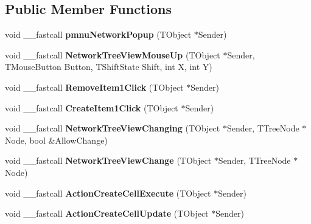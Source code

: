 \subsection*{Public Member Functions}
\begin{DoxyCompactItemize}
\item 
\hypertarget{class_t_network_g_u_i_a69805bd1ca490f7cfdb93ad4d02396a3}{void \+\_\+\+\_\+fastcall {\bfseries pmnu\+Network\+Popup} (T\+Object $\ast$Sender)}\label{class_t_network_g_u_i_a69805bd1ca490f7cfdb93ad4d02396a3}

\item 
\hypertarget{class_t_network_g_u_i_a91572bded8ffc3dec2a80b139dee0d43}{void \+\_\+\+\_\+fastcall {\bfseries Network\+Tree\+View\+Mouse\+Up} (T\+Object $\ast$Sender, T\+Mouse\+Button Button, T\+Shift\+State Shift, int X, int Y)}\label{class_t_network_g_u_i_a91572bded8ffc3dec2a80b139dee0d43}

\item 
\hypertarget{class_t_network_g_u_i_af4698aec82e6da7ca1344f2556369183}{void \+\_\+\+\_\+fastcall {\bfseries Remove\+Item1\+Click} (T\+Object $\ast$Sender)}\label{class_t_network_g_u_i_af4698aec82e6da7ca1344f2556369183}

\item 
\hypertarget{class_t_network_g_u_i_ae891d8bff24c1fb29233b2996888e5cf}{void \+\_\+\+\_\+fastcall {\bfseries Create\+Item1\+Click} (T\+Object $\ast$Sender)}\label{class_t_network_g_u_i_ae891d8bff24c1fb29233b2996888e5cf}

\item 
\hypertarget{class_t_network_g_u_i_a38a0e176bdb4e3b7ed9a41a92aadbcd7}{void \+\_\+\+\_\+fastcall {\bfseries Network\+Tree\+View\+Changing} (T\+Object $\ast$Sender, T\+Tree\+Node $\ast$Node, bool \&Allow\+Change)}\label{class_t_network_g_u_i_a38a0e176bdb4e3b7ed9a41a92aadbcd7}

\item 
\hypertarget{class_t_network_g_u_i_a74f52871b9d9eb774293cec2c07b63cb}{void \+\_\+\+\_\+fastcall {\bfseries Network\+Tree\+View\+Change} (T\+Object $\ast$Sender, T\+Tree\+Node $\ast$Node)}\label{class_t_network_g_u_i_a74f52871b9d9eb774293cec2c07b63cb}

\item 
\hypertarget{class_t_network_g_u_i_a1ddf3f343514af4a052d9b7185d0f83b}{void \+\_\+\+\_\+fastcall {\bfseries Action\+Create\+Cell\+Execute} (T\+Object $\ast$Sender)}\label{class_t_network_g_u_i_a1ddf3f343514af4a052d9b7185d0f83b}

\item 
\hypertarget{class_t_network_g_u_i_a7e81f9895cc22a62c9c8fe7afc84683c}{void \+\_\+\+\_\+fastcall {\bfseries Action\+Create\+Cell\+Update} (T\+Object $\ast$Sender)}\label{class_t_network_g_u_i_a7e81f9895cc22a62c9c8fe7afc84683c}


\end{DoxyCompactItemize}
